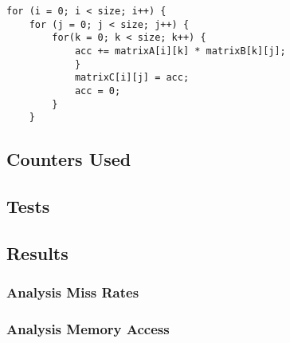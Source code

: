 \documentclass[a4paper,10pt,openright,openbib]{article}
\begin{document}
\begin{verbatim}
for (i = 0; i < size; i++) {
    for (j = 0; j < size; j++) {
        for(k = 0; k < size; k++) {
            acc += matrixA[i][k] * matrixB[k][j];				
            }		
            matrixC[i][j] = acc;	
            acc = 0;
        }
    }
\end{verbatim}

\subsection{Counters Used}
\subsection{Tests}
\subsection{Results}
\subsubsection{Analysis Miss Rates}
\subsubsection{Analysis Memory Access}
\end{document}
